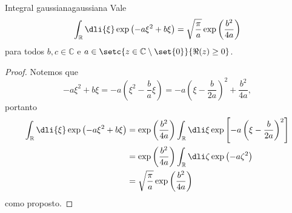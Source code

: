 \begin{lemma}{Integral gaussiana}{gaussiana}
    Vale
    \begin{equation*}
       \int_{\mathbb{R}} \dli{\xi} \exp\left(-a \xi^2 + b \xi\right) = \sqrt{\frac{\pi}{a}} \exp\left(\frac{b^2}{4a}\right)
    \end{equation*}
    para todos \(b,c \in \mathbb{C}\) e \(a \in \setc{z \in \mathbb{C}\setminus\set{0}}{\Re(z) \geq 0}\).
\end{lemma}
\begin{proof}
    Notemos que
    \begin{equation*}
       -a \xi^2 + b \xi = - a \left(\xi^2 - \frac{b}{a}\xi\right) = -a \left(\xi - \frac{b}{2a}\right)^2 + \frac{b^2}{4a},
    \end{equation*}
    portanto
    \begin{align*}
       \int_{\mathbb{R}} \dli{\xi} \exp\left(-a \xi^2 + b \xi\right) &= \exp\left(\frac{b^2}{4a}\right) \int_{\mathbb{R}} \dli\xi \exp\left[-a \left(\xi - \frac{b}{2a}\right)^2\right]\\
                                                                     &= \exp\left(\frac{b^2}{4a}\right) \int_{\mathbb{R}} \dli\zeta \exp\left(-a \zeta^2\right)\\
                                                                     &= \sqrt{\frac{\pi}{a}} \exp\left(\frac{b^2}{4a}\right)
    \end{align*}
    como proposto.
\end{proof}

